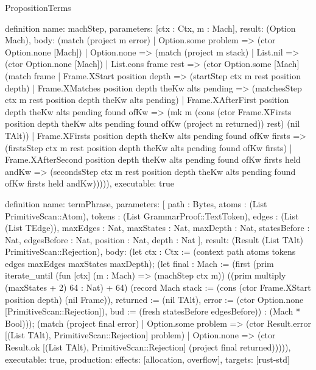 \begin{lexlean}{PropositionTerms}
\begin{semanticmodule}
definition{
  name: machStep,
  parameters: [ctx : Ctx, m : Mach],
  result: (Option Mach),
  body: (match (project m error)
    | Option.some problem => (ctor Option.none [Mach])
    | Option.none => (match (project m stack)
      | List.nil => (ctor Option.none [Mach])
      | List.cons frame rest => (ctor Option.some [Mach] (match frame
        | Frame.XStart position depth => (startStep ctx m rest position depth)
        | Frame.XMatches position depth theKw alts pending => (matchesStep ctx m rest position depth theKw alts pending)
        | Frame.XAfterFirst position depth theKw alts pending found ofKw => (mk m (cons (ctor Frame.XFirsts position depth theKw alts pending found ofKw (project m returned)) rest) (nil TAlt))
        | Frame.XFirsts position depth theKw alts pending found ofKw firsts => (firstsStep ctx m rest position depth theKw alts pending found ofKw firsts)
        | Frame.XAfterSecond position depth theKw alts pending found ofKw firsts held andKw => (secondsStep ctx m rest position depth theKw alts pending found ofKw firsts held andKw))))),
  executable: true
}

definition{
  name: termPhrase,
  parameters: [
    path : Bytes,
    atoms : (List PrimitiveScan::Atom),
    tokens : (List GrammarProof::TextToken),
    edges : (List (List TEdge)),
    maxEdges : Nat,
    maxStates : Nat,
    maxDepth : Nat,
    statesBefore : Nat,
    edgesBefore : Nat,
    position : Nat,
    depth : Nat
  ],
  result: (Result (List TAlt) PrimitiveScan::Rejection),
  body: (let ctx : Ctx := (context path atoms tokens edges maxEdges maxStates maxDepth); (let final : Mach := (first (prim iterate_until (fun [ctx] (m : Mach) => (machStep ctx m)) ((prim multiply (maxStates + 2) 64 : Nat) + 64) (record Mach {stack := (cons (ctor Frame.XStart position depth) (nil Frame)), returned := (nil TAlt), error := (ctor Option.none [PrimitiveScan::Rejection]), bud := (fresh statesBefore edgesBefore)}) : (Mach * Bool))); (match (project final error)
    | Option.some problem => (ctor Result.error [(List TAlt), PrimitiveScan::Rejection] problem)
    | Option.none => (ctor Result.ok [(List TAlt), PrimitiveScan::Rejection] (project final returned))))),
  executable: true,
  production: {effects: [allocation, overflow], targets: [rust-std]}
}
\end{semanticmodule}
\end{lexlean}
